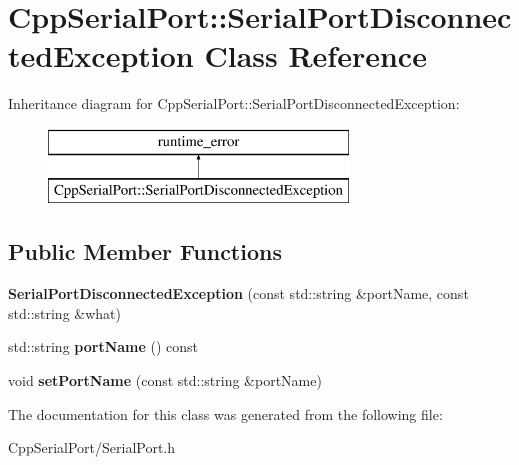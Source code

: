 \hypertarget{class_cpp_serial_port_1_1_serial_port_disconnected_exception}{}\section{Cpp\+Serial\+Port\+:\+:Serial\+Port\+Disconnected\+Exception Class Reference}
\label{class_cpp_serial_port_1_1_serial_port_disconnected_exception}
Inheritance diagram for Cpp\+Serial\+Port\+:\+:Serial\+Port\+Disconnected\+Exception\+:\begin{figure}[H]
\begin{center}
\leavevmode
\includegraphics[height=2.000000cm]{class_cpp_serial_port_1_1_serial_port_disconnected_exception}
\end{center}
\end{figure}
\subsection*{Public Member Functions}
\begin{DoxyCompactItemize}
\item 
\mbox{\label{class_cpp_serial_port_1_1_serial_port_disconnected_exception_afb00f2aba1cc7aa2bf956a88a6885fde}} 
{\bfseries Serial\+Port\+Disconnected\+Exception} (const std\+::string \&port\+Name, const std\+::string \&what)
\item 
\mbox{\label{class_cpp_serial_port_1_1_serial_port_disconnected_exception_ad2026ae9ebb13be071eaad93a86f125a}} 
std\+::string {\bfseries port\+Name} () const
\item 
\mbox{\label{class_cpp_serial_port_1_1_serial_port_disconnected_exception_a1514d0c574d676b9625a988dc5ee64c5}} 
void {\bfseries set\+Port\+Name} (const std\+::string \&port\+Name)
\end{DoxyCompactItemize}


The documentation for this class was generated from the following file\+:\begin{DoxyCompactItemize}
\item 
Cpp\+Serial\+Port/Serial\+Port.\+h\end{DoxyCompactItemize}
